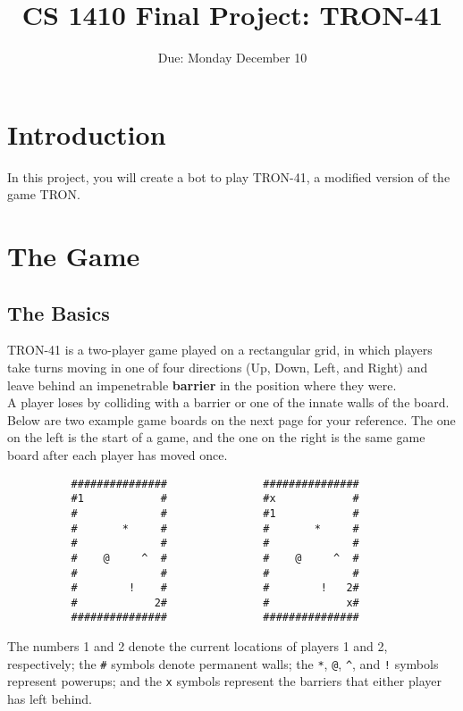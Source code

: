 \documentclass{article}
\title{CS 1410 Final Project: TRON-41}
\date{Due: Monday December 10}
\begin{document}
\maketitle

\section{Introduction}
   In this project, you will create a bot to play TRON-41, a modified version of the game TRON.

\section{The Game}
    \subsection{The Basics}
    TRON-41 is a two-player game played on a rectangular grid, in which players take turns moving in one of four directions (Up, Down, Left, and Right) and leave behind an impenetrable \textbf{barrier} in the position where they were. ~\\

    A player loses by colliding with a barrier or one of the innate walls of the board.
    Below are two example game boards on the next page for your reference.
    The one on the left is the start of a game, and the one on the right is the same game board after each player has moved once. ~\\

    \begin{centering}
    \begin{verbatim}
          ###############               ###############
          #1            #               #x            #
          #             #               #1            #
          #       *     #               #       *     #
          #             #               #             #
          #    @     ^  #               #    @     ^  #
          #             #               #             #
          #        !    #               #        !   2#
          #            2#               #            x#
          ###############               ###############
    \end{verbatim}
    \end{centering}

    The numbers 1 and 2 denote the current locations of players 1 and 2, respectively; the \verb|#| symbols denote permanent walls; the \verb|*|, \verb|@|, \verb|^|, and \verb|!| symbols represent powerups; and the \verb|x| symbols represent the barriers that either player has left behind.
\end{document}

